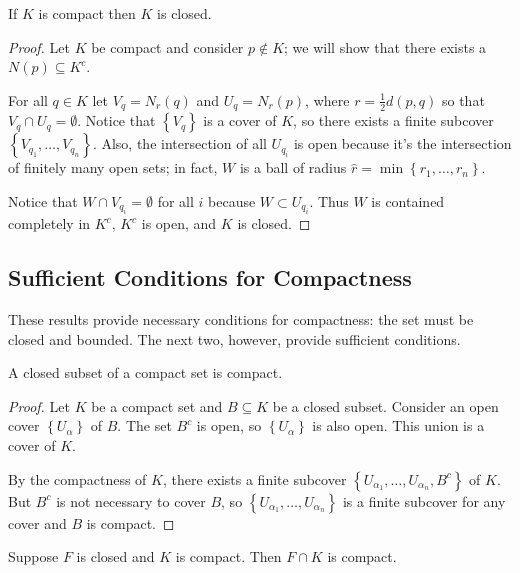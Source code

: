 \documentclass[../m131main.tex]{subfiles}
\begin{document}
\begin{theorem}
    If $K$ is compact then $K$ is closed.
\end{theorem}

\begin{proof}
    Let $K$ be compact and consider $p \not\in K$; we will show that there exists a $N(p) \subseteq K^c$.

    For all $q \in K$ let $V_q = N_r(q)$ and $U_q = N_r(p)$, where $r = \frac{1}{2} d(p,q)$ so that $V_q \cap U_q = \emptyset$.
    Notice that $\left\{ V_q \right\}$ is a cover of $K$, so there exists a finite subcover $\left\{ V_{q_1} , \ldots, V_{q_n}\right\}$.
    Also, the intersection of all $U_{q_i}$ is open because it's the intersection of finitely many open sets; in fact, $W$ is a ball of radius $\hat r = \min \left\{ r_1, \ldots, r_n \right\}$.

    Notice that $W \cap V_{q_i} = \emptyset$ for all $i$ because $W \subset U_{q_i}$.
    Thus $W$ is contained completely in $K^c$, $K^c$ is open, and $K$ is closed.
\end{proof}

\subsection*{Sufficient Conditions for Compactness}
These results provide necessary conditions for compactness: the set must be closed and bounded.
The next two, however, provide sufficient conditions.

\begin{theorem}[]
    A closed subset of a compact set is compact.
\end{theorem}

\begin{proof}
    Let $K$ be a compact set and $B \subseteq K$ be a closed subset.
    Consider an open cover $\left\{ U_\alpha \right\}$ of $B$.
    The set $B^c$ is open, so $\left\{ U_\alpha \right\}$ is also open.
    This union is a cover of $K$.

    By the compactness of $K$, there exists a finite subcover $\left\{ U_{\alpha_1}, \ldots, U_{\alpha_n}, B^c \right\}$ of $K$.
    But $B^c$ is not necessary to cover $B$, so $\left\{ U_{\alpha_1}, \ldots, U_{\alpha_n} \right\}$ is a finite subcover for any cover and $B$ is compact.
\end{proof}

\begin{corollary}[]
    Suppose $F$ is closed and $K$ is compact.
    Then $F \cap K$ is compact.
\end{corollary}
\end{document}
